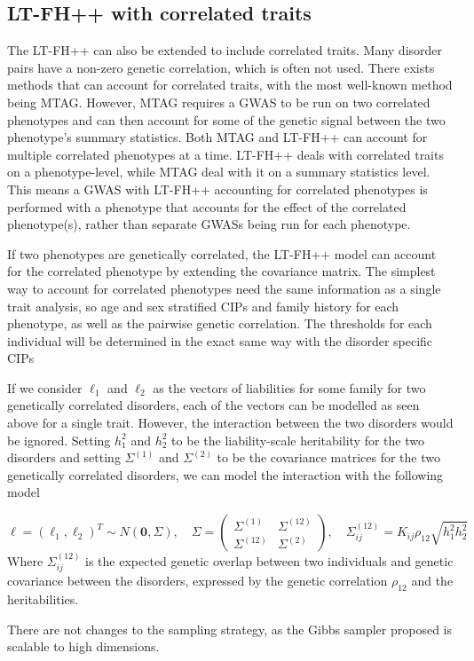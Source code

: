\subsection{LT-FH++ with correlated traits}
The LT-FH++ can also be extended to include correlated traits. Many disorder pairs have a non-zero genetic correlation, which is often not used. There exists methods that can account for correlated traits, with the most well-known method being MTAG. However, MTAG requires a GWAS to be run on two correlated phenotypes and can then account for some of the genetic signal between the two phenotype's summary statistics. Both MTAG and LT-FH++ can account for multiple correlated phenotypes at a time. LT-FH++ deals with correlated traits on a phenotype-level, while MTAG deal with it on a summary statistics level. This means a GWAS with LT-FH++ accounting for correlated phenotypes is performed with a phenotype that accounts for the effect of the correlated phenotype(s), rather than separate GWASs being run for each phenotype. 

If two phenotypes are genetically correlated, the LT-FH++ model can account for the correlated phenotype by extending the covariance matrix. The simplest way to account for correlated phenotypes need the same information as a single trait analysis, so age and sex stratified CIPs and family history for each phenotype, as well as the pairwise genetic correlation. The thresholds for each individual will be determined in the exact same way with the disorder specific CIPs


If we consider $ \ell_1 $ and $ \ell_2 $ as the vectors of liabilities for some family for two genetically correlated disorders, each of the vectors can be modelled as seen above for a single trait. However, the interaction between the two disorders would be ignored. Setting $ h_1^2 $ and $ h_2^2 $ to be the liability-scale heritability for the two disorders and setting  $ \Sigma^{(1)} $ and $ \Sigma^{(2)} $ to be the covariance matrices for the two genetically correlated disorders, we can model the interaction with the following model

\begin{equation*}
	\ell = \left(\ell_1, \ell_2\right)^T \sim N(\mathbf{0}, \Sigma), \quad \Sigma = 
	\begin{pmatrix} 
		\Sigma^{(1)} & \Sigma^{(12)} \\
		\Sigma^{(12)} & \Sigma^{(2)} 
	\end{pmatrix}, \quad \Sigma^{(12)}_{ij} = K_{ij}\rho_{12}\sqrt{h_1^2 h_2^2}
\end{equation*}
Where $ \Sigma_{ij}^{(12)} $ is the expected genetic overlap between two individuals and genetic covariance between the disorders, expressed by the genetic correlation $ \rho_{12} $ and the heritabilities.

There are not changes to the sampling strategy, as the Gibbs sampler proposed is scalable to high dimensions.


